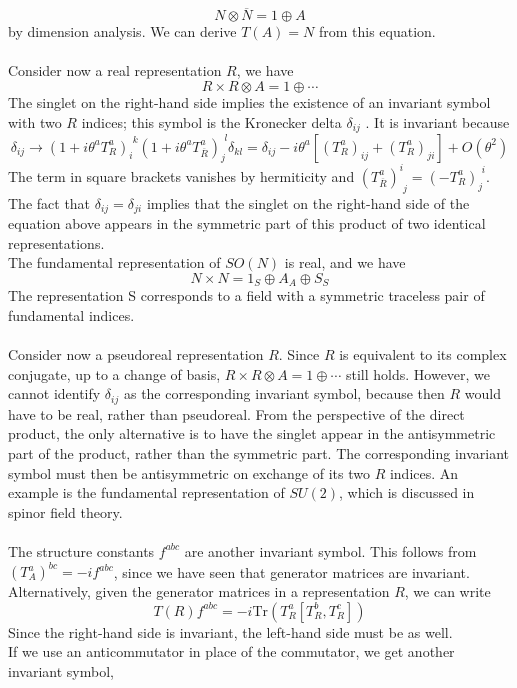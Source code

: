 \[N \otimes \overline{N} = 1 \oplus A \]
by dimension analysis. We can derive $T(A) = N$ from this equation.
\\ \\
Consider now a real representation $R$, we have
\[R \times R \otimes A = 1 \oplus \cdots\]
The singlet on the right-hand side implies the existence of an invariant symbol with two $R$ indices; this symbol is the Kronecker delta $\delta_{ij}$ . It is invariant because
\[\delta_{ij} \to (1+i\theta^a T^a_R)_{i}^{\phantom{i}k} (1+i\theta^a T^a_{\overline{R}})_{j}^{\phantom{i}l}\delta_{kl} = \delta_{ij} - i\theta^a [(T^a_R)_{ij} + (T^a_R)_{ji}] + O(\theta^2)\]
The term in square brackets vanishes by hermiticity and $(T^{a}_{\overline{R}})^{i}_{\phantom{i}j} = (-T^{a}_R)_{j}^{\phantom{i}i}$. 
The fact that $\delta_{ij} = \delta_{ji}$ implies that the singlet on the right-hand side of the equation above appears in the symmetric part of this product of two identical representations.
\\
The fundamental representation of $SO(N)$ is real, and we have
\[N \times N = 1_S \oplus A_A \oplus S_S\]
The representation S corresponds to a field with a symmetric traceless pair of fundamental indices.
\\ \\
Consider now a pseudoreal representation $R$. Since $R$ is equivalent to its complex conjugate, up to a change of basis, $R \times R \otimes A = 1 \oplus \cdots$  still holds. However, we cannot identify $\delta_{ij}$ as the corresponding invariant symbol, because then $R$ would have to be real, rather than pseudoreal. 
From the perspective of the direct product, the only alternative is to have the singlet appear in the antisymmetric part of the product, rather than the symmetric part. The corresponding invariant symbol must then be antisymmetric on exchange of its two $R$ indices.
An example is the fundamental representation of $SU(2)$, which is discussed in spinor field theory.
\\ \\
The structure constants $f^{abc}$ are another invariant symbol. This follows from $(T^a_A)^{bc} = -if^{abc}$, since we have seen that generator matrices are invariant.
\\
Alternatively, given the generator matrices in a representation $R$, we can write
\[T(R)f^{abc} = -i \mathrm{Tr}(T^a_R[T^b_R,T^c_R])\]
Since the right-hand side is invariant, the left-hand side must be as well.
\\
If we use an anticommutator in place of the commutator, we get another invariant symbol,
